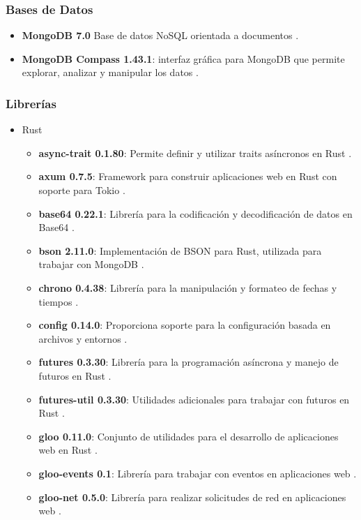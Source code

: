 \subsubsection*{Bases de Datos}
\begin{itemize}
\item \textbf{MongoDB 7.0} Base de datos NoSQL orientada a documentos \cite{mongodb}.
\item \textbf{MongoDB Compass 1.43.1}: interfaz gráfica para MongoDB que permite explorar, analizar y manipular los datos \cite{mongodb_compass}.
\end{itemize}

\subsubsection*{Librerías}
\begin{itemize}
\item Rust
    \begin{itemize}
    \item \textbf{async-trait 0.1.80}: Permite definir y utilizar traits asíncronos en Rust \cite{async_trait}.
    \item \textbf{axum 0.7.5}: Framework para construir aplicaciones web en Rust con soporte para Tokio \cite{axum}.
    \item \textbf{base64 0.22.1}: Librería para la codificación y decodificación de datos en Base64 \cite{base64}.
    \item \textbf{bson 2.11.0}: Implementación de BSON para Rust, utilizada para trabajar con MongoDB \cite{bson}.
    \item \textbf{chrono 0.4.38}: Librería para la manipulación y formateo de fechas y tiempos \cite{chrono}.
    \item \textbf{config 0.14.0}: Proporciona soporte para la configuración basada en archivos y entornos \cite{config}.
    \item \textbf{futures 0.3.30}: Librería para la programación asíncrona y manejo de futuros en Rust \cite{futures}.
    \item \textbf{futures-util 0.3.30}: Utilidades adicionales para trabajar con futuros en Rust \cite{futures_util}.
    \item \textbf{gloo 0.11.0}: Conjunto de utilidades para el desarrollo de aplicaciones web en Rust \cite{gloo}.
    \item \textbf{gloo-events 0.1}: Librería para trabajar con eventos en aplicaciones web \cite{gloo_events}.
    \item \textbf{gloo-net 0.5.0}: Librería para realizar solicitudes de red en aplicaciones web \cite{gloo_net}.

\end{itemize}
\end{itemize}
